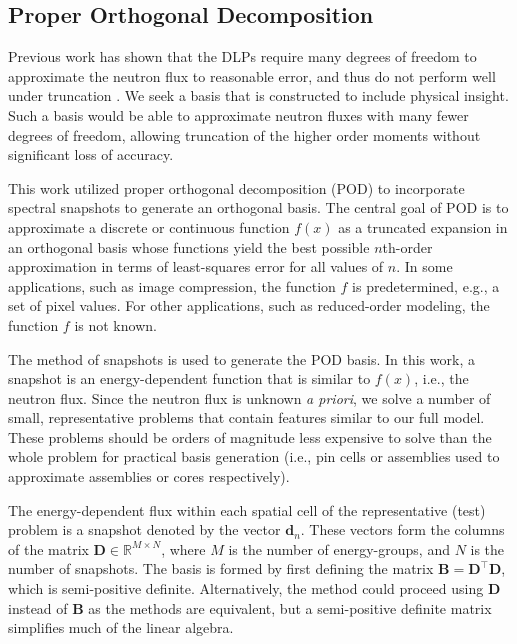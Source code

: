 \documentclass[5p,times,twocolumn,10pt]{elsarticle}
\renewcommand{\vec}[1]{\bm{#1}} %
\newcommand{\mat}[1]{\ensuremath{\bm{#1}}}
\renewcommand{\vec}[1]{\ensuremath{\bm{#1}}}
\begin{document}
    \subsection{Proper Orthogonal Decomposition}
    \label{basis}
    Previous work has shown that the DLPs require many degrees of freedom to approximate the neutron flux to reasonable error, and thus do not perform well under truncation \cite{zhu_discrete_2010, zhu_discrete_2012, gibson_application_2012}.
    We seek a basis that is constructed to include physical insight.
    Such a basis would be able to approximate neutron fluxes with many fewer degrees of freedom, allowing truncation of the higher order moments without significant loss of accuracy.

    This work utilized proper orthogonal decomposition (POD) to incorporate spectral snapshots to generate an orthogonal basis.
    The central goal of POD is to approximate a discrete or continuous function $f(x)$ as a truncated expansion in an orthogonal basis whose functions yield the best possible $n$th-order approximation in terms of least-squares error for all values of $n$.
    In some applications, such as image compression, the function $f$ is predetermined, e.g., a set of pixel values.
    For other applications, such as reduced-order modeling, the function $f$ is not known.

    The method of snapshots \cite{buchan2013pod, sirovich1987turbulence} is used to generate the POD basis.
    In this work, a snapshot is an energy-dependent function that is similar to $f(x)$, i.e., the neutron flux.
    Since the neutron flux is unknown {\it a priori}, we solve a number of small, representative problems that contain features similar to our full model.
    These problems should be orders of magnitude less expensive to solve than the whole problem for practical basis generation (i.e., pin cells or assemblies used to approximate assemblies or cores respectively).
    
    The energy-dependent flux within each spatial cell of the representative (test) problem is a snapshot denoted by the vector $\vec{d}_n$.
    These vectors form the columns of the matrix $\mat{D} \in \mathbb{R}^{M\times N}$, where $M$ is the number of energy-groups, and $N$ is the number of snapshots.
    The basis is formed by first defining the matrix $\mat{B}=\mat{D}^\intercal\mat{D}$, which is semi-positive definite.
    Alternatively, the method could proceed using $\mat{D}$ instead of $\mat{B}$ as the methods are equivalent, but a semi-positive definite matrix simplifies much of the linear algebra.
    
\end{document}
